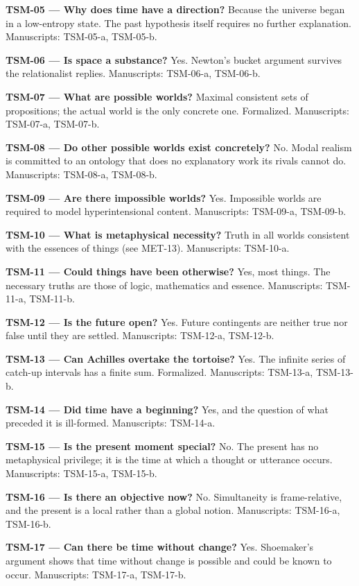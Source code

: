 \documentclass[10pt]{article}
\begin{document}
\textbf{TSM-05 --- Why does time have a direction?} Because the universe began in a low-entropy state. The past hypothesis itself requires no further explanation. Manuscripts: TSM-05-a, TSM-05-b.

\textbf{TSM-06 --- Is space a substance?} Yes. Newton's bucket argument survives the relationalist replies. Manuscripts: TSM-06-a, TSM-06-b.

\textbf{TSM-07 --- What are possible worlds?} Maximal consistent sets of propositions; the actual world is the only concrete one. Formalized. Manuscripts: TSM-07-a, TSM-07-b.

\textbf{TSM-08 --- Do other possible worlds exist concretely?} No. Modal realism is committed to an ontology that does no explanatory work its rivals cannot do. Manuscripts: TSM-08-a, TSM-08-b.

\textbf{TSM-09 --- Are there impossible worlds?} Yes. Impossible worlds are required to model hyperintensional content. Manuscripts: TSM-09-a, TSM-09-b.

\textbf{TSM-10 --- What is metaphysical necessity?} Truth in all worlds consistent with the essences of things (see MET-13). Manuscripts: TSM-10-a.

\textbf{TSM-11 --- Could things have been otherwise?} Yes, most things. The necessary truths are those of logic, mathematics and essence. Manuscripts: TSM-11-a, TSM-11-b.

\textbf{TSM-12 --- Is the future open?} Yes. Future contingents are neither true nor false until they are settled. Manuscripts: TSM-12-a, TSM-12-b.

\textbf{TSM-13 --- Can Achilles overtake the tortoise?} Yes. The infinite series of catch-up intervals has a finite sum. Formalized. Manuscripts: TSM-13-a, TSM-13-b.

\textbf{TSM-14 --- Did time have a beginning?} Yes, and the question of what preceded it is ill-formed. Manuscripts: TSM-14-a.

\textbf{TSM-15 --- Is the present moment special?} No. The present has no metaphysical privilege; it is the time at which a thought or utterance occurs. Manuscripts: TSM-15-a, TSM-15-b.

\textbf{TSM-16 --- Is there an objective now?} No. Simultaneity is frame-relative, and the present is a local rather than a global notion. Manuscripts: TSM-16-a, TSM-16-b.

\textbf{TSM-17 --- Can there be time without change?} Yes. Shoemaker's argument shows that time without change is possible and could be known to occur. Manuscripts: TSM-17-a, TSM-17-b.
\end{document}
